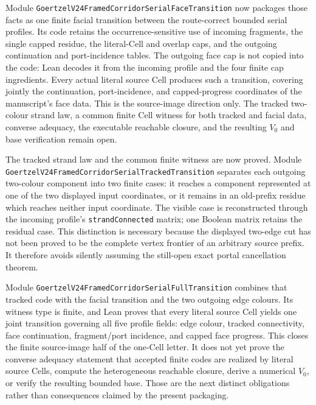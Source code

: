 \documentclass[11pt]{article}
\theoremstyle{definition}
\begin{document}
Module
\texttt{GoertzelV24FramedCorridorSerialFaceTransition} now packages those
facts as one finite facial transition between the route-correct bounded serial
profiles.  Its code retains the occurrence-sensitive use of incoming
fragments, the single capped residue, the literal-Cell and overlap caps, and
the outgoing continuation and port-incidence tables.  The outgoing face cap
is not copied into the code: Lean decodes it from the incoming profile and
the four finite cap ingredients.  Every actual literal source Cell produces
such a transition, covering jointly the continuation, port-incidence, and
capped-progress coordinates of the manuscript's face data.  This is the
source-image direction only.  The tracked two-colour strand law, a common
finite Cell witness for both tracked and facial data, converse adequacy, the
executable reachable closure, and the resulting $V_0$ and base verification
remain open.

The tracked strand law and the common finite witness are now proved.  Module
\texttt{GoertzelV24FramedCorridorSerialTrackedTransition} separates each
outgoing two-colour component into two finite cases: it reaches a component
represented at one of the two displayed input coordinates, or it remains in
an old-prefix residue which reaches neither input coordinate.  The visible
case is reconstructed through the incoming profile's
\texttt{strandConnected} matrix; one Boolean matrix retains the residual
case.  This distinction is necessary because the displayed two-edge cut has
not been proved to be the complete vertex frontier of an arbitrary source
prefix.  It therefore avoids silently assuming the still-open exact portal
cancellation theorem.

Module
\texttt{GoertzelV24FramedCorridorSerialFullTransition} combines that tracked
code with the facial transition and the two outgoing edge colours.  Its
witness type is finite, and Lean proves that every literal source Cell yields
one joint transition governing all five profile fields: edge colour, tracked
connectivity, face continuation, fragment/port incidence, and capped face
progress.  This closes the finite source-image half of the one-Cell letter.
It does not yet prove the converse adequacy statement that accepted finite
codes are realized by literal source Cells, compute the heterogeneous
reachable closure, derive a numerical $V_0$, or verify the resulting bounded
base.  Those are the next distinct obligations rather than consequences
claimed by the present packaging.
\end{document}
